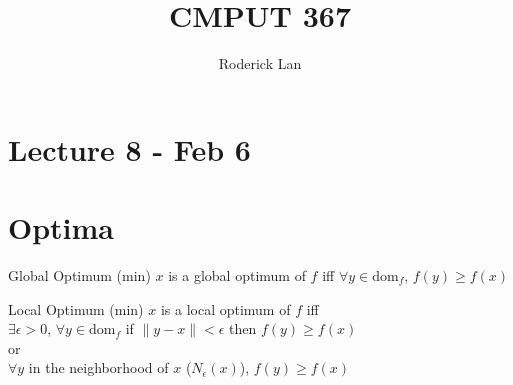 \documentclass{article}
\title{CMPUT 367}
\author{Roderick Lan}
\date{}
\begin{document}
\maketitle

\tableofcontents
\break

\section*{Lecture 8 - Feb 6}
\section{Optima}
\begin{definition}
    {Global Optimum (min)}{}
    $x$ is a global optimum of $f$ iff $\forall y\in \mathrm{dom}_f$, $f(y) \ge f(x)$
\end{definition}


\begin{definition}
    {Local Optimum (min)}{}
    $x$ is a local optimum of $f$ iff 
    \\
    $\exists \epsilon > 0$, $\forall y\in \mathrm{dom}_f$ if $\| y-x \| < \epsilon$
    then $f(y) \ge f(x)$ 
    \\
    or
    \\
    $\forall y$ in the neighborhood of $x$ ($N_\epsilon (x)$), $f(y) \ge f(x)$
\end{definition}
\end{document}
